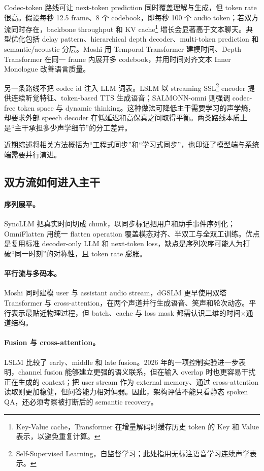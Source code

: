 \documentclass[UTF8,fontset=none,a4paper,10pt]{ctexart}
\begin{document}
Codec-token 路线可让 next-token prediction 同时覆盖理解与生成，但 token rate 很高。假设每秒 12.5 frame、8 个 codebook，即每秒 100 个 audio token；若双方流同时存在，backbone throughput 和 KV cache\footnote{Key-Value cache，Transformer 在增量解码时缓存历史 token 的 Key 和 Value 表示，以避免重复计算。} 增长会显著高于文本聊天。典型优化包括 delay pattern、hierarchical depth decoder、multi-token prediction 和 semantic/acoustic 分层。Moshi 用 Temporal Transformer 建模时间、Depth Transformer 在同一 frame 内展开多 codebook，并用时间对齐文本 Inner Monologue 改善语言质量\cite{defossez2024moshi}。

另一条路线不把 codec id 注入 LLM 词表。LSLM 以 streaming SSL\footnote{Self-Supervised Learning，自监督学习；此处指用无标注语音学习连续声学表示。} encoder 提供连续听觉特征、token-based TTS 生成语音；SALMONN-omni 则强调 codec-free token space 与 dynamic thinking\cite{ma2025lslm,yu2025salmonnomni}。这种做法可降低主干需要学习的声学熵，却要求外部 speech decoder 在低延迟和高保真之间取得平衡。两类路线本质上是“主干承担多少声学细节”的分工差异。

近期综述将相关方法概括为“工程式同步”和“学习式同步”，也印证了模型端与系统端需要并行演进\cite{chen2025survey}。

\subsection{双方流如何进入主干}

\paragraph{序列展平。}
SyncLLM 把真实时间切成 chunk，以同步标记把用户和助手事件序列化；OmniFlatten 用统一 flatten operation 覆盖模态对齐、半双工与全双工训练\cite{veluri2024syncllm,zhang2024omniflatten}。优点是复用标准 decoder-only LLM 和 next-token loss，缺点是序列次序可能人为打破“同一时刻”的对称性，且 token rate 膨胀。

\paragraph{平行流与多码本。}
Moshi 同时建模 user 与 assistant audio stream，dGSLM 更早使用双塔 Transformer 与 cross-attention，在两个声道并行生成语音、笑声和轮次动态\cite{nguyen2022dgslm,defossez2024moshi}。平行表示最贴近物理过程，但 batch、cache 与 loss mask 都需认识二维的时间$\times$通道结构。

\paragraph{Fusion 与 cross-attention。}
LSLM 比较了 early、middle 和 late fusion。2026 年的一项控制实验进一步表明，channel fusion 能够建立更强的语义联系，但在输入 overlap 时也更容易干扰正在生成的 context；把 user stream 作为 external memory、通过 cross-attention 读取则更加稳健，但问答能力相对偏弱\cite{ma2025lslm,lu2026routing}。因此，架构评估不能只看静态 spoken QA，还必须考察被打断后的 semantic recovery。
\end{document}
